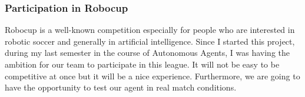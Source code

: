 \subsubsection*{Participation in Robocup}
Robocup is a well-known competition especially for people who are interested in robotic soccer and generally in artificial intelligence. Since I started this project, during my last semester in the course of Autonomous Agents, I was having the ambition for our team to participate in this league. It will not be easy to be competitive at once but it will be a nice experience. Furthermore, we are going to have the opportunity to test our agent in real match conditions.
 


